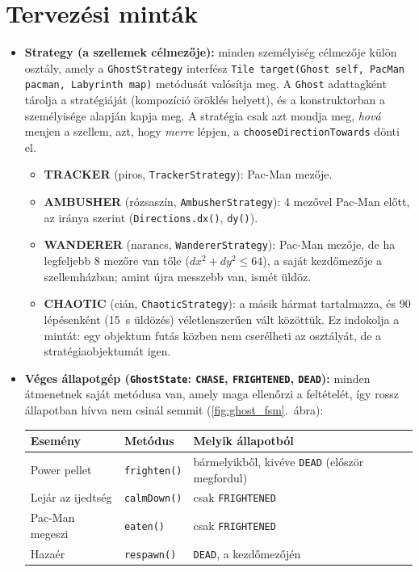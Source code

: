 \documentclass[11pt, a4paper]{article}
\begin{document}
\section{Tervezési minták}
\label{sec:design_patterns}
\begin{itemize}[itemsep=3pt]
    \item \textbf{Strategy (a szellemek célmezője):} minden személyiség célmezője külön osztály, amely a \texttt{GhostStrategy} interfész \texttt{Tile target(Ghost self, PacMan pacman, Labyrinth map)} metódusát valósítja meg. A \texttt{Ghost} adattagként tárolja a stratégiáját (kompozíció öröklés helyett), és a konstruktorban a személyisége alapján kapja meg. A stratégia csak azt mondja meg, \textit{hová} menjen a szellem, azt, hogy \textit{merre} lépjen, a \texttt{chooseDirectionTowards} dönti el.
    \begin{itemize}[itemsep=1pt]
        \item \textbf{TRACKER} (piros, \texttt{TrackerStrategy}): Pac-Man mezője.
        \item \textbf{AMBUSHER} (rózsaszín, \texttt{AmbusherStrategy}): 4 mezővel Pac-Man előtt, az iránya szerint (\texttt{Directions.dx()}, \texttt{dy()}).
        \item \textbf{WANDERER} (narancs, \texttt{WandererStrategy}): Pac-Man mezője, de ha legfeljebb 8 mezőre van tőle ($dx^2 + dy^2 \le 64$), a saját kezdőmezője a szellemházban; amint újra messzebb van, ismét üldöz.
        \item \textbf{CHAOTIC} (cián, \texttt{ChaoticStrategy}): a másik hármat tartalmazza, és 90 lépésenként (15~s üldözés) véletlenszerűen vált közöttük. Ez indokolja a mintát: egy objektum futás közben nem cserélheti az osztályát, de a stratégiaobjektumát igen.
    \end{itemize}
    \item \textbf{Véges állapotgép (\texttt{GhostState}: \texttt{CHASE}, \texttt{FRIGHTENED}, \texttt{DEAD}):} minden átmenetnek saját metódusa van, amely maga ellenőrzi a feltételét, így rossz állapotban hívva nem csinál semmit (\ref{fig:ghost_fsm}.~ábra):

    \vspace{0.1cm}
    \begin{tabular}{@{}lll@{}}
        \toprule
        \textbf{Esemény} & \textbf{Metódus} & \textbf{Melyik állapotból} \\
        \midrule
        Power pellet & \texttt{frighten()} & bármelyikből, kivéve \texttt{DEAD} (először megfordul) \\
        Lejár az ijedtség & \texttt{calmDown()} & csak \texttt{FRIGHTENED} \\
        Pac-Man megeszi & \texttt{eaten()} & csak \texttt{FRIGHTENED} \\
        Hazaér & \texttt{respawn()} & \texttt{DEAD}, a kezdőmezőjén \\
        \bottomrule
    \end{tabular}
    \vspace{0.1cm}


\end{itemize}
\end{document}
